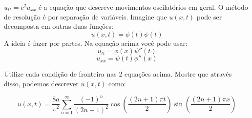 \documentclass[11pt,a4paper]{article}
\newcommand{\somatorio}{\displaystyle\sum}
\begin{document}
\begin{enumerate}
	$u_{tt} = c^2u_{xx}$ é a equação que descreve movimentos oscilatórios em geral. O método de resolução é por separação de variáveis. Imagine que $u(x,t)$ pode ser decomposta em outras duas funções:
	$$u(x,t) = \phi (t) \psi (t) $$
	A ideia é fazer por partes. Na equação acima você pode usar:
	$$u_{tt} = \phi (x) \psi ''(t) $$
	$$u_{xx} = \psi (t) \phi ''(x) $$
	
	Utilize cada condição de fronteira nas 2 equações acima. Mostre que através disso, podemos descrever $u(x,t)$ como:
	
	$$u(x,t) = \displaystyle\frac{8a}{\pi ^2} \somatorio_{n=1}^{\infty} \displaystyle\frac{(-1)^n}{(2n + 1)^2} \cos \displaystyle\left(\frac{(2n + 1)\pi t}{2}\right) \sin \displaystyle\left(\frac{(2n + 1)\pi x}{2}\right)$$

\end{enumerate}
		
	
\end{document}
